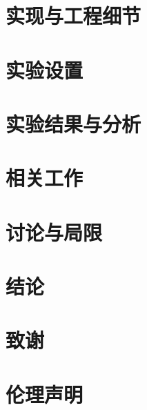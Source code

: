 \documentclass[11pt]{article}
\begin{document}
\section{实现与工程细节}

\section{实验设置}

\section{实验结果与分析}

\section{相关工作}

\section{讨论与局限}

\section{结论}

\section*{致谢}

\section*{伦理声明}


\end{document}
